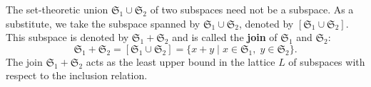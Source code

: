 The set-theoretic union $\mathfrak{S}_1 \cup \mathfrak{S}_2$ of two subspaces need not be a subspace. As a substitute, we take the subspace spanned by $\mathfrak{S}_1 \cup \mathfrak{S}_2$, denoted by $[\mathfrak{S}_1 \cup \mathfrak{S}_2]$. This subspace is denoted by $\mathfrak{S}_1 + \mathfrak{S}_2$ and is called the \textbf{join} of $\mathfrak{S}_1$ and $\mathfrak{S}_2$:
$$
\mathfrak{S}_1 + \mathfrak{S}_2 = [\mathfrak{S}_1 \cup \mathfrak{S}_2] = \{x + y \mid x \in \mathfrak{S}_1,\; y \in \mathfrak{S}_2\}.
$$
The join $\mathfrak{S}_1 + \mathfrak{S}_2$ acts as the least upper bound in the lattice $L$ of subspaces with respect to the inclusion relation.
